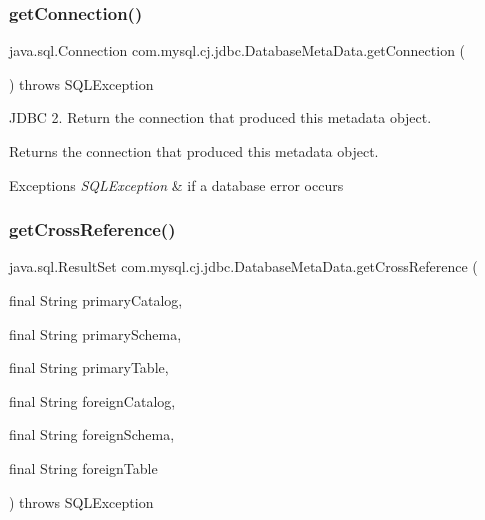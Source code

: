 \subsubsection{\texorpdfstring{get\+Connection()}{getConnection()}}
{\footnotesize\ttfamily java.\+sql.\+Connection com.\+mysql.\+cj.\+jdbc.\+Database\+Meta\+Data.\+get\+Connection (\begin{DoxyParamCaption}{ }\end{DoxyParamCaption}) throws S\+Q\+L\+Exception}

J\+D\+BC 2. Return the connection that produced this metadata object.

\begin{DoxyReturn}{Returns}
the connection that produced this metadata object. 
\end{DoxyReturn}

\begin{DoxyExceptions}{Exceptions}
{\em S\+Q\+L\+Exception} & if a database error occurs \\
\hline
\end{DoxyExceptions}
\mbox{\label{classcom_1_1mysql_1_1cj_1_1jdbc_1_1_database_meta_data_a5542eb619f90b95f2cc8418c8b61bb67}} 
\subsubsection{\texorpdfstring{get\+Cross\+Reference()}{getCrossReference()}}
{\footnotesize\ttfamily java.\+sql.\+Result\+Set com.\+mysql.\+cj.\+jdbc.\+Database\+Meta\+Data.\+get\+Cross\+Reference (\begin{DoxyParamCaption}\item[{final String}]{primary\+Catalog,  }\item[{final String}]{primary\+Schema,  }\item[{final String}]{primary\+Table,  }\item[{final String}]{foreign\+Catalog,  }\item[{final String}]{foreign\+Schema,  }\item[{final String}]{foreign\+Table }\end{DoxyParamCaption}) throws S\+Q\+L\+Exception}

